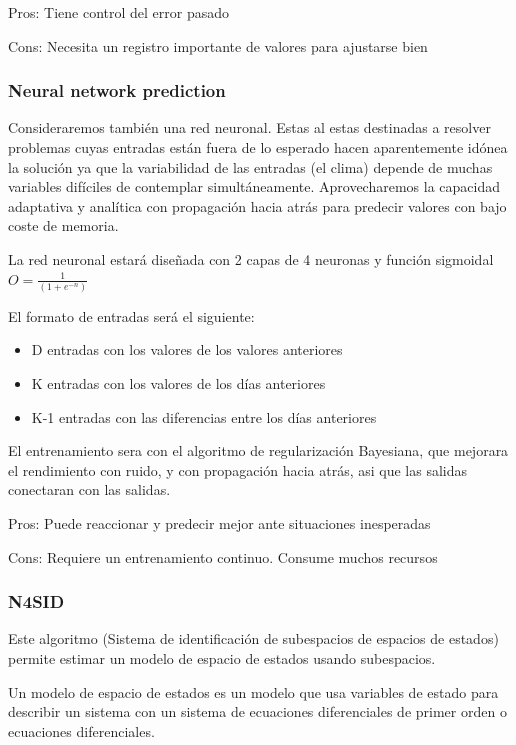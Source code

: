 Pros: Tiene control del error pasado

Cons: Necesita un registro importante de valores para ajustarse bien


\subsubsection{ Neural network prediction} 
\label{ssub:subsubsection_name}

Consideraremos también una red neuronal. Estas al estas destinadas a resolver problemas cuyas entradas están fuera de lo esperado hacen aparentemente idónea la solución ya que la variabilidad de las entradas (el clima) depende de muchas variables difíciles de contemplar simultáneamente.
Aprovecharemos la capacidad adaptativa y analítica con propagación hacia atrás para predecir valores con bajo coste de memoria.

La red neuronal estará diseñada con 2 capas de 4 neuronas y función sigmoidal $O = \frac{1}{(1+e^{-n})}$

El formato de entradas será el siguiente:
\begin{itemize}
	\item D entradas con los valores de los valores anteriores
	\item K entradas con los valores de los días anteriores
	\item K-1 entradas con las diferencias entre los días anteriores
\end{itemize}

El entrenamiento sera con el algoritmo de regularización Bayesiana, que mejorara el rendimiento con ruido, y con propagación hacia atrás, asi que las salidas conectaran con las salidas.

Pros: Puede reaccionar y predecir mejor ante situaciones inesperadas

Cons: Requiere un entrenamiento continuo. Consume muchos recursos


\subsubsection{N4SID}
\label{ssub:n4sid}

Este algoritmo (Sistema de identificación de subespacios de espacios de estados) permite estimar un modelo de espacio de estados usando subespacios.

Un modelo de espacio de estados es un modelo que usa variables de estado para describir un sistema con un sistema de ecuaciones diferenciales de primer orden o ecuaciones diferenciales. 

